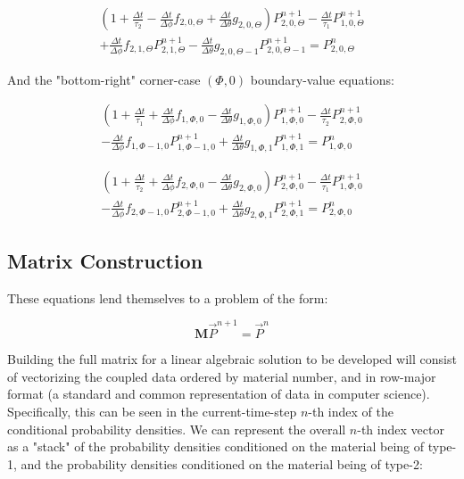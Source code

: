 \documentclass[12pt,a4paper,pagesize=pdftex]{scrartcl}
\begin{document}
\begin{multline*}
    \left(1 + \frac{\Delta t}{\tau_2} - \frac{\Delta t}{\Delta \phi} f_{2,0,\Theta} + \frac{\Delta t}{\Delta \theta} g_{2,0,\Theta}\right) P^{n+1}_{2,0,\Theta} - \frac{\Delta t}{\tau_1} P^{n+1}_{1,0,\Theta} \\+ \frac{\Delta t}{\Delta \phi} f_{2,1,\Theta} P^{n+1}_{2,1,\Theta} - \frac{\Delta t}{\Delta \theta} g_{2,0,\Theta-1} P^{n+1}_{2,0,\Theta-1} = P^n_{2,0,\Theta}
\end{multline*}

And the "bottom-right" corner-case \(\left(\Phi,0\right)\) boundary-value equations:

\begin{multline*}
    \left(1 + \frac{\Delta t}{\tau_1} + \frac{\Delta t}{\Delta \phi} f_{1,\Phi,0} - \frac{\Delta t}{\Delta \theta} g_{1,\Phi,0}\right) P^{n+1}_{1,\Phi,0} - \frac{\Delta t}{\tau_2}P^{n+1}_{2,\Phi,0} \\- \frac{\Delta t}{\Delta \phi} f_{1,\Phi-1,0} P^{n+1}_{1,\Phi-1,0} + \frac{\Delta t}{\Delta \theta} g_{1,\Phi,1} P^{n+1}_{1,\Phi,1} = P^n_{1,\Phi,0}
\end{multline*}

\begin{multline*}
    \left(1 + \frac{\Delta t}{\tau_2} + \frac{\Delta t}{\Delta \phi} f_{2,\Phi,0} - \frac{\Delta t}{\Delta \theta} g_{2,\Phi,0}\right) P^{n+1}_{2,\Phi,0} - \frac{\Delta t}{\tau_1}P^{n+1}_{1,\Phi,0} \\- \frac{\Delta t}{\Delta \phi} f_{2,\Phi-1,0} P^{n+1}_{2,\Phi-1,0} + \frac{\Delta t}{\Delta \theta} g_{2,\Phi,1} P^{n+1}_{2,\Phi,1} = P^n_{2,\Phi,0}
\end{multline*}

\subsection*{Matrix Construction}
These equations lend themselves to a problem of the form:

\begin{equation*}
    \mathbf{M} \vec{P}^{n+1} = \vec{P}^n
\end{equation*}

Building the full matrix for a linear algebraic solution to be developed will consist of vectorizing the coupled data ordered by material number, and in row-major format (a standard and common representation of data in computer science). Specifically, this can be seen in the current-time-step \(n\)-th index of the conditional probability densities. We can represent the overall \(n\)-th index vector as a "stack" of the probability densities conditioned on the material being of type-1, and the probability densities conditioned on the material being of type-2:
\end{document}
